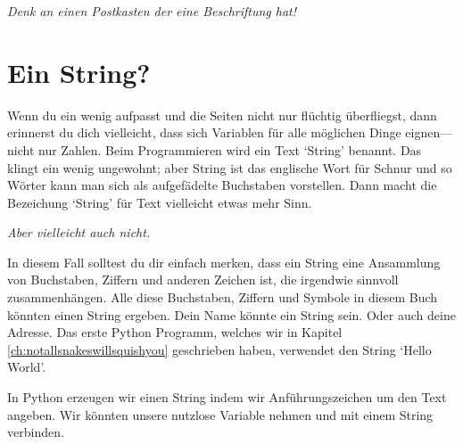 \noindent
\emph{Denk an einen Postkasten der eine Beschriftung hat!}

\section{Ein String?}

Wenn du ein wenig aufpasst und die Seiten nicht nur flüchtig überfliegst, dann erinnerst du dich vielleicht, dass sich Variablen für alle möglichen Dinge eignen---nicht nur Zahlen. Beim Programmieren wird ein Text `String' benannt. Das klingt ein wenig ungewohnt; aber String ist das englische Wort für Schnur und so Wörter kann man sich als aufgefädelte Buchstaben vorstellen. Dann macht die Bezeichung `String' für Text vielleicht etwas mehr Sinn.

\noindent
\emph{Aber vielleicht auch nicht.}

In diesem Fall solltest du dir einfach merken, dass ein String eine Ansammlung von Buchstaben, Ziffern und anderen Zeichen ist, die irgendwie sinnvoll zusammenhängen. Alle diese Buchstaben, Ziffern und Symbole in diesem Buch könnten einen String ergeben. Dein Name könnte ein String sein. Oder auch deine Adresse. Das erste Python Programm, welches wir in Kapitel \ref{ch:notallsnakeswillsquishyou} geschrieben haben, verwendet den String `Hello World'.

\par
In Python erzeugen wir einen String indem wir Anführungszeichen um den Text angeben. Wir könnten unsere nutzlose  Variable nehmen und mit einem String verbinden.

